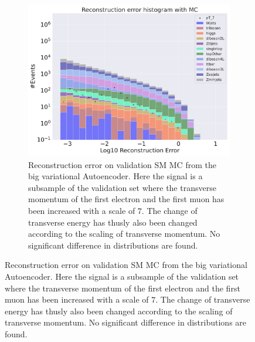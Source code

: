 \begin{figure}[h!]
\begin{subfigure}{.45\textwidth}
        \includegraphics[width=\textwidth]{Figures/AE_testing/big/b_data_recon_big_rm3_feats_sig_pT_7.pdf}
        \caption{Reconstruction error on validation SM MC from the big variational Autoencoder. Here the signal is a subsample of the validation 
        set where the transverse momentum of the first electron and the first muon has been increased with a scale of $7$. The change of transverse 
        energy has thusly also been changed according to the scaling of transverse momentum. No significant difference in distributions are found. }
        \label{fig:ae_big_pt_7}
    \end{subfigure}
    \hfill 
    \label{fig:ae_big_small_pt_7}
\end{figure}

